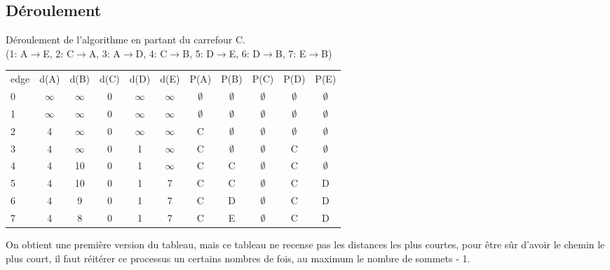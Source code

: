 \documentclass[11pt]{extarticle}
\begin{document}
\subsection{Déroulement}
Déroulement de l'algorithme en partant du carrefour C.\\
(1: A$\rightarrow$E, 2: C$\rightarrow$A, 3: A$\rightarrow$D, 4: C$\rightarrow$B, 5: D$\rightarrow$E, 6: D$\rightarrow$B, 7: E$\rightarrow$B)
\begin{center}
\begin{tabular*}{0.95\textwidth}{|l|c|c|c|c|c||c|c|c|c|c|}
 \rowcolor{light_green} edge & d(A) & d(B) & d(C) & d(D) & d(E) & P(A)& P(B)& P(C)& P(D)& P(E) \\
  \rowcolor{light_green2} 0 & $\infty$ & $\infty$ & 0 & $\infty$ & $\infty$ & $\emptyset$ & $\emptyset$ & $\emptyset$ & $\emptyset$ & $\emptyset$ \\
   \rowcolor{light_green2} 1 & $\infty$ & $\infty$ & 0 & $\infty$ & \cellcolor{blue} $\infty$ & $\emptyset$ & $\emptyset$ & $\emptyset$ & $\emptyset$ & $\emptyset$ \\
   \rowcolor{light_green2} 2 & \cellcolor{blue} 4 & $\infty$ & 0 & $\infty$ & $\infty$ & \cellcolor{blue} C & $\emptyset$ & $\emptyset$ & $\emptyset$ & $\emptyset$ \\
   \rowcolor{light_green2}  3 & 4 & $\infty$ & 0 & \cellcolor{blue} 1 & $\infty$ & C & $\emptyset$ & $\emptyset$ & \cellcolor{blue} C & $\emptyset$ \\
   \rowcolor{light_green2}  4 & 4 & \cellcolor{blue} 10 & 0 & 1 & $\infty$ & C & \cellcolor{blue} C & $\emptyset$ & C & $\emptyset$ \\
   \rowcolor{light_green2}  5 & 4 & 10 & 0 & 1 & \cellcolor{blue} 7 & C & C & $\emptyset$ & C & \cellcolor{blue} D \\
   \rowcolor{light_green2}  6 & 4 & \cellcolor{blue} 9 & 0 & 1 & 7 & C & \cellcolor{blue} D & $\emptyset$ & C & D \\
   \rowcolor{light_green2}  7 & 4 & \cellcolor{blue} 8 & 0 & 1 & 7 & C & \cellcolor{blue} E & $\emptyset$ & C & D \\
 \end{tabular*}
\end{center}
On obtient une première version du tableau, mais ce tableau ne recense pas les distances les plus courtes, pour être sûr d'avoir le chemin le plus court, il faut réitérer ce processus un certains nombres de fois, au maximum le nombre de sommets - 1.\\
\end{document}
